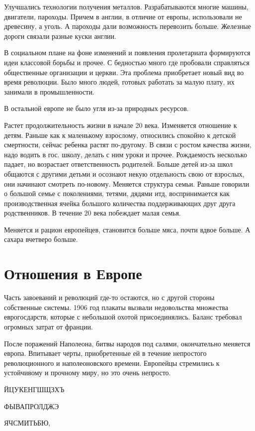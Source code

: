 \documentclass[a4paper, 12pt]{article}
\begin{document}
\begin{multicols}{2}
Улучшались технологии получения металлов. 
Разрабатываются многие машины, двигатели, пароходы. Причем в англии, в отличие от европы, использовали не древесину, а уголь. А пароходы дали возможность перевозить больше. Железные дороги связали разные куски англии. 

В социальном плане на фоне изменений и появления пролетариата формируются идеи классовой борьбы и прочее. С бедностью много где пробовали справляться общественные организации и церкви. Эта проблема приобретает новый вид во время революции. Было много людей, готовых работать за малую плату, их занимали в промышленности. 

В остальной европе не было угля из-за природных ресурсов. 

Растет продолжительность жизни в начале 20 века. Изменяется отношение к детям. Раньше как к маленькому взрослому, относились спокойно к детской смертности, сейчас ребенка растят по-другому. В связи с ростом качества жизни, надо водить в гос. школу, делать с ним уроки и прочее. Рождаемость несколько падает, но возрастает ответственность родителей. Больше детей из-за школ общаются с другими детьми и осознают некую отдельность свою от взрослых, они начинают смотреть по-новому. Меняется структура семьи. Раньше говорили о большой семье с поколениями, тетями, дядями итд, воспринимается как производственная ячейка большого количества поддерживающих друг друга родственников. В течение 20 века побеждает малая семья. 

Меняется и рацион европейцев, становится больше мяса, почти вдвое больше. А сахара вчетверо больше. 


\section{Отношения в Европе}

Часть завоеваний и революций где-то остаются, но с другой стороны собственные системы. 1906 год плакаты вызвали недовольства множества еврогосдарств, которые с небольшой охотой присоединялись. Баланс требовал огромных затрат от франции. 

После поражений Наполеона, битвы народов под салями, окончательно меняется европа. Впитывает черты, приобретенные ей в течение непростого революционного и наполеоновского времени. Европейцы стремились к устойчивому и прочному миру, но это очень непросто. 

ЙЦУКЕНГШЩЗХЪ

ФЫВАПРОЛДЖЭ

ЯЧСМИТЬБЮ,


\end{multicols}
\end{document}
